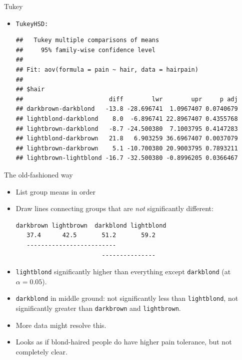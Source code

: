 \begin{frame}[fragile]{Tukey}

  \begin{itemize}
  \item \texttt{TukeyHSD:}

{\footnotesize
 
\begin{knitrout}
\color{fgcolor}\begin{kframe}
\begin{alltt}
\end{alltt}
\begin{verbatim}
##   Tukey multiple comparisons of means
##     95% family-wise confidence level
## 
## Fit: aov(formula = pain ~ hair, data = hairpain)
## 
## $hair
##                        diff        lwr        upr     p adj
## darkbrown-darkblond   -13.8 -28.696741  1.0967407 0.0740679
## lightblond-darkblond    8.0  -6.896741 22.8967407 0.4355768
## lightbrown-darkblond   -8.7 -24.500380  7.1003795 0.4147283
## lightblond-darkbrown   21.8   6.903259 36.6967407 0.0037079
## lightbrown-darkbrown    5.1 -10.700380 20.9003795 0.7893211
## lightbrown-lightblond -16.7 -32.500380 -0.8996205 0.0366467
\end{verbatim}
\end{kframe}
\end{knitrout}
}



  \end{itemize}



\end{frame}

\begin{frame}[fragile]{The old-fashioned way}
  
  \begin{itemize}
  \item List group means in order
  \item Draw lines connecting groups that are \emph{not} significantly
    different:
    
\begin{verbatim}
darkbrown lightbrown  darkblond lightblond
   37.4      42.5       51.2       59.2
   -------------------------
                        ---------------
\end{verbatim}

  \item \texttt{lightblond} significantly higher than everything
    except \texttt{darkblond} (at $\alpha=0.05$).
  \item \texttt{darkblond} in middle ground: not significantly less
    than \texttt{lightblond}, not significantly greater than
    \texttt{darkbrown} and \texttt{lightbrown}.
  \item More data might resolve this.
  \item Looks as if blond-haired people do have higher pain tolerance,
    but not completely clear.
  \end{itemize}
  
\end{frame}


